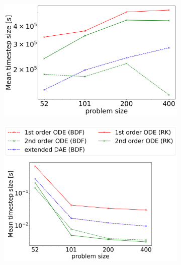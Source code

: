 \begin{figure}[H]
	\centering
	\begin{subfigure}[b]{0.32\textwidth}
		\centering
		\includegraphics[width=1\textwidth]{images/TANDEM_MeanTimeStepSize_AseismicPhase.png}
	\end{subfigure}
	\begin{subfigure}[b]{0.32\textwidth}
		\centering \hspace{-0.75cm}
		\includegraphics[width=1.14\textwidth]{images/TANDEM_MeanTimeStepSize_EarthquakePhase.png}
	\end{subfigure}
	\begin{subfigure}[b]{0.32\textwidth}

\end{subfigure}
\end{figure}
